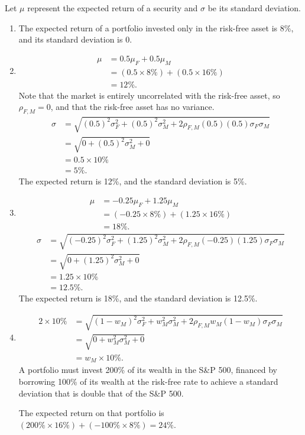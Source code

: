 \documentclass[12pt]{article}
\begin{document}
\section{}
Let $\mu$ represent the expected return of a security and $\sigma$ be its standard deviation.
\begin{enumerate}
    \item The expected return of a portfolio invested only in the risk-free asset is $8\%$, and its standard deviation is 0. 
    \item\begin{align*}
    \mu
    &=0.5\mu_F+0.5\mu_M\\
    &=(0.5\times 8\%)+(0.5\times 16\%)\\
    &=12\%.
    \end{align*}
    Note that the market is entirely uncorrelated with the risk-free asset, so $\rho_{F,M}=0$, and that the risk-free asset has no variance.
    \begin{align*}
    \sigma
    &=\sqrt{(0.5)^2\sigma_F^2+(0.5)^2\sigma_M^2+2\rho_{F,M}(0.5)(0.5)\sigma_F\sigma_M}\\
    &=\sqrt{0+(0.5)^2\sigma_M^2+0}\\
    &=0.5\times 10\%\\
    &=5\%.
    \end{align*}
    The expected return is 12\%, and the standard deviation is 5\%.
    \item\begin{align*}
    \mu
    &=-0.25\mu_F+1.25\mu_M\\
    &=(-0.25\times 8\%)+(1.25\times 16\%)\\
    &=18\%.
    \end{align*}
    \begin{align*}
    \sigma
    &=\sqrt{(-0.25)^2\sigma_F^2+(1.25)^2\sigma_M^2+2\rho_{F,M}(-0.25)(1.25)\sigma_F\sigma_M}\\
    &=\sqrt{0+(1.25)^2\sigma_M^2+0}\\
    &=1.25\times 10\%\\
    &=12.5\%.
    \end{align*}
    The expected return is 18\%, and the standard deviation is 12.5\%.
    \item 
    \begin{align*}
    2\times 10\%
    &=\sqrt{(1-w_M)^2\sigma_F^2+w_M^2\sigma_M^2+2\rho_{F,M}w_M(1-w_M)\sigma_F\sigma_M}\\
    &=\sqrt{0+w_M^2\sigma_M^2+0}\\
    &=w_M\times 10\%.
    \end{align*}
    A portfolio must invest 200\% of its wealth in the S\&P 500, financed by borrowing 100\% of its wealth at the risk-free rate to achieve a standard deviation that is double that of the S\&P 500. 

    The expected return on that portfolio is $(200\%\times 16\%)+(-100\%\times 8\%)=24\%$.
\end{enumerate}
\end{document}
